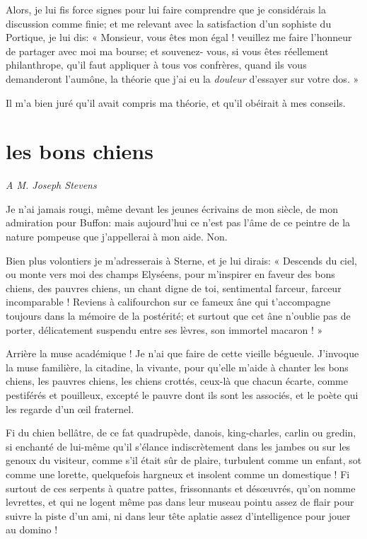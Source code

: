 Alors, je lui fis force signes pour lui faire comprendre que je
considérais la discussion comme finie; et me relevant avec la
satisfaction d’un sophiste du Portique, je lui dis: «
Monsieur, vous êtes mon égal ! veuillez me faire
l’honneur de partager avec moi ma bourse; et
souvenez{}- vous, si vous êtes réellement philanthrope,
qu’il faut appliquer à tous vos confrères, quand ils
vous demanderont l’aumône, la théorie que
j’ai eu la \textit{douleur} d’essayer sur
votre dos. »

Il m’a bien juré qu’il avait compris
ma théorie, et qu’il obéirait à mes conseils.

\quebra\section[Les bons chiens]{les bons chiens }

\begin{flushright}
\textit{A M. Joseph Stevens} 
\end{flushright}

Je n’ai jamais rougi, même devant les jeunes écrivains
de mon siècle, de mon admiration pour Buffon: mais
aujourd’hui ce n’est pas
l’âme de ce peintre de la nature pompeuse que
j’appellerai à mon aide. Non.

Bien plus volontiers je m’adresserais à Sterne, et je
lui dirais: « Descends du ciel, ou monte vers moi des champs Elyséens,
pour m’inspirer en faveur des bons chiens, des pauvres
chiens, un chant digne de toi, sentimental farceur, farceur
incomparable ! Reviens à califourchon sur ce fameux âne qui
t’accompagne toujours dans la mémoire de la postérité;
et surtout que cet âne n’oublie pas de porter,
délicatement suspendu entre ses lèvres, son immortel macaron ! »

Arrière la muse académique ! Je n’ai que faire de cette
vieille bégueule. J’invoque la muse familière, la
citadine, la vivante, pour qu’elle
m’aide à chanter les bons chiens, les pauvres chiens,
les chiens crottés, ceux{}-là que chacun écarte, comme pestiférés et
pouilleux, excepté le pauvre dont ils sont les associés, et le poète
qui les regarde d’un \oe il fraternel.

Fi du chien bellâtre, de ce fat quadrupède, danois, king{}-charles,
carlin ou gredin, si enchanté de lui{}-même qu’il
s’élance indiscrètement dans les jambes ou sur les
genoux du visiteur, comme s’il était sûr de plaire,
turbulent comme un enfant, sot comme une lorette, quelquefois hargneux
et insolent comme un domestique ! Fi surtout de ces serpents à quatre
pattes, frissonnants et dés\oe uvrés, qu’on nomme
levrettes, et qui ne logent même pas dans leur museau pointu assez de
flair pour suivre la piste d’un ami, ni dans leur tête
aplatie assez d’intelligence pour jouer au domino !

